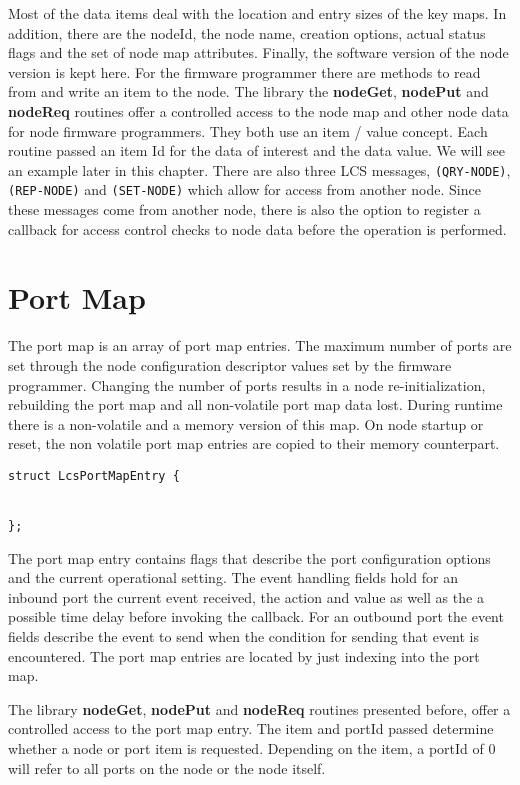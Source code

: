 Most of the data items deal with the location and entry sizes of the key maps. In addition, there are the nodeId, the node name, creation options, actual status flags and the set of node map attributes. Finally, the software version of the node version is kept here. For the firmware programmer there are methods to read from and write an item to the node. The library the \textbf{nodeGet}, \textbf{nodePut} and \textbf{nodeReq} routines offer a controlled access to the node map and other node data for node firmware programmers. They both use an item / value concept. Each routine passed an item Id for the data of interest and the data value. We will see an example later in this chapter. There are also three LCS messages, \texttt{(QRY-NODE)}, \texttt{(REP-NODE)} and \texttt{(SET-NODE)} which allow for access from another node. Since these messages come from another node, there is also the option to register a callback for access control checks to node data before the operation is performed.

\section{Port Map}

The port map is an array of port map entries. The maximum number of ports are set through the node configuration descriptor values set by the firmware programmer. Changing the number of ports results in a node re-initialization, rebuilding the port map and all non-volatile port map data lost. During runtime there is a non-volatile and a memory version of this map. On node startup or reset, the non volatile port map entries are copied to their memory counterpart.

\lstset{language=c++, style=codesnippetstyle}
\begin{lstlisting}
struct LcsPortMapEntry {

  
};
\end{lstlisting}

The port map entry contains flags that describe the port configuration options and the current operational setting. The event handling fields hold for an inbound port the current event received, the action and value as well as the a possible time delay before invoking the callback. For an outbound port the event fields describe the event to send when the condition for sending that event is encountered. The port map entries are located by just indexing into the port map.

The library \textbf{nodeGet}, \textbf{nodePut} and \textbf{nodeReq} routines presented before, offer a controlled access to the port map entry. The item and portId passed determine whether a node or port item is requested. Depending on the item, a portId of 0 will refer to all ports on the node or the node itself.

